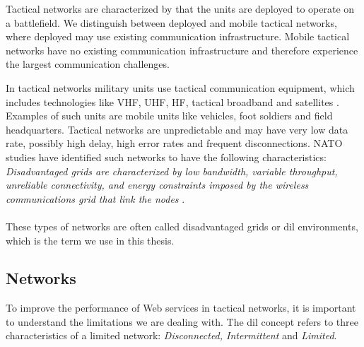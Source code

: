 Tactical networks are characterized by that the units are deployed to operate on
a battlefield. We distinguish between deployed and mobile tactical networks,
where deployed may use existing communication infrastructure. Mobile tactical
networks have no existing communication infrastructure and therefore experience
the largest communication challenges.

 In tactical networks military units use tactical communication equipment, which
 includes technologies like VHF, UHF, HF, tactical broadband and satellites
 \cite{ist-090}. Examples of such units are mobile units like vehicles, foot
 soldiers and field headquarters. Tactical networks are unpredictable and may
 have very low data rate, possibly high delay, high error rates and frequent
 disconnections. NATO studies\cite{nato-disadvantaged-grids} have identified
 such networks to have the following characteristics: \\

\textit{
Disadvantaged grids are characterized by low bandwidth, variable throughput,
unreliable connectivity, and energy constraints imposed by the wireless
communications grid that link the nodes
}.

\paragraph{}

These types of networks are often called disadvantaged grids or \gls{dil}
environments, which is the term we use in this thesis.

\subsection{ Networks}
\label{dil}

To improve the performance of Web services in tactical networks, it is important
to understand the limitations we are dealing with. The \gls{dil} concept refers
to three characteristics of a limited network: \textit{Disconnected,
Intermittent} and \textit{Limited}.

